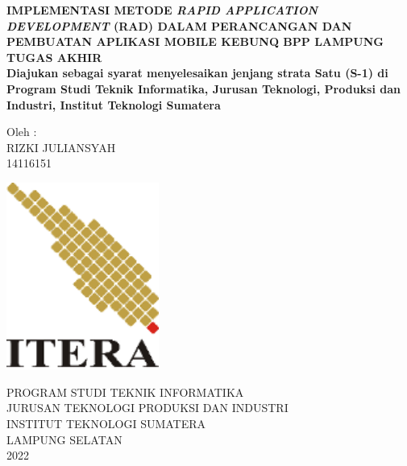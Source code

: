 \begin{center}


	


	\onehalfspacing
	\large \bfseries IMPLEMENTASI METODE \textit{RAPID APPLICATION DEVELOPMENT} (RAD) DALAM PERANCANGAN DAN PEMBUATAN APLIKASI MOBILE KEBUNQ BPP LAMPUNG\\
	\vspace{2cm}
	 \large TUGAS AKHIR \\
	 \normalfont \normalsize Diajukan sebagai syarat menyelesaikan jenjang strata Satu (S-1) di Program Studi Teknik Informatika, Jurusan Teknologi, Produksi dan Industri, Institut Teknologi Sumatera\\
	 
	\vspace{1cm}
	
	
	\large Oleh : \\
	RIZKI JULIANSYAH \\
	14116151
	
	\vspace{1cm}
	\includegraphics[width=5cm]{images/logo-itera.png}\\
	\vspace{2cm}
	
	\large PROGRAM STUDI TEKNIK INFORMATIKA \\
	JURUSAN TEKNOLOGI PRODUKSI DAN INDUSTRI \\
	INSTITUT TEKNOLOGI SUMATERA \\
	LAMPUNG SELATAN \\
	2022
	

	
\end{center}

\newpage